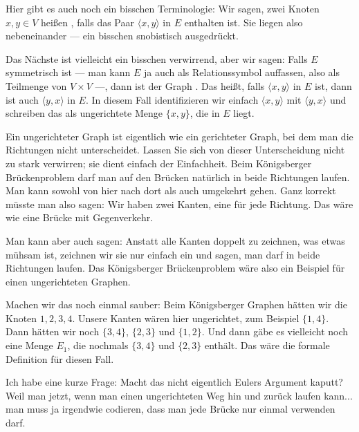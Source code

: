 \begin{spoken-clean}[00:16:52 - 00:20:32]
Hier gibt es auch noch ein bisschen Terminologie: Wir sagen, zwei Knoten $x, y \in V$ heißen , falls das Paar $\langle x, y \rangle$ in $E$ enthalten ist. Sie liegen also nebeneinander --- ein bisschen snobistisch ausgedrückt.

Das Nächste ist vielleicht ein bisschen verwirrend, aber wir sagen: Falls $E$ symmetrisch ist --- man kann $E$ ja auch als Relationssymbol auffassen, also als Teilmenge von $V \times V$ ---, dann ist der Graph . Das heißt, falls $\langle x, y \rangle$ in $E$ ist, dann ist auch $\langle y, x \rangle$ in $E$. In diesem Fall identifizieren wir einfach $\langle x, y \rangle$ mit $\langle y, x \rangle$ und schreiben das als ungerichtete Menge $\{x, y\}$, die in $E$ liegt.

Ein ungerichteter Graph ist eigentlich wie ein gerichteter Graph, bei dem man die Richtungen nicht unterscheidet. Lassen Sie sich von dieser Unterscheidung nicht zu stark verwirren; sie dient einfach der Einfachheit. Beim Königsberger Brückenproblem darf man auf den Brücken natürlich in beide Richtungen laufen. Man kann sowohl von hier nach dort als auch umgekehrt gehen. Ganz korrekt müsste man also sagen: Wir haben zwei Kanten, eine für jede Richtung. Das wäre wie eine Brücke mit Gegenverkehr.

Man kann aber auch sagen: Anstatt alle Kanten doppelt zu zeichnen, was etwas mühsam ist, zeichnen wir sie nur einfach ein und sagen, man darf in beide Richtungen laufen. Das Königsberger Brückenproblem wäre also ein Beispiel für einen ungerichteten Graphen.

Machen wir das noch einmal sauber: Beim Königsberger Graphen hätten wir die Knoten $1, 2, 3, 4$. Unsere Kanten wären hier ungerichtet, zum Beispiel $\{1, 4\}$. Dann hätten wir noch $\{3, 4\}$, $\{2, 3\}$ und $\{1, 2\}$. Und dann gäbe es vielleicht noch eine Menge $E_1$, die nochmals $\{3, 4\}$ und $\{2, 3\}$ enthält. Das wäre die formale Definition für diesen Fall.
\end{spoken-clean}

\begin{student-interaction}[Studentenfrage]
Ich habe eine kurze Frage: Macht das nicht eigentlich Eulers Argument kaputt? Weil man jetzt, wenn man einen ungerichteten Weg hin und zurück laufen kann... man muss ja irgendwie codieren, dass man jede Brücke nur einmal verwenden darf.
\end{student-interaction}

